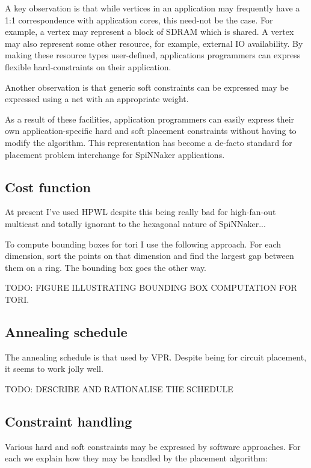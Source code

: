 			A key observation is that while vertices in an application may frequently
			have a 1:1 correspondence with application cores, this need-not be the
			case. For example, a vertex may represent a block of SDRAM which is
			shared. A vertex may also represent some other resource, for example,
			external IO availability. By making these resource types user-defined,
			applications programmers can express flexible hard-constraints on their
			application.
			
			Another observation is that generic soft constraints can be expressed may
			be expressed using a net with an appropriate weight.
			
			As a result of these facilities, application programmers can easily
			express their own application-specific hard and soft placement
			constraints without having to modify the algorithm. This representation
			has become a de-facto standard for placement problem interchange for
			SpiNNaker applications.
		
		\subsection{Cost function}
			
			At present I've used HPWL despite this being really bad for high-fan-out
			multicast and totally ignorant to the hexagonal nature of SpiNNaker...
			
			To compute bounding boxes for tori I use the following approach. For each
			dimension, sort the points on that dimension and find the largest gap
			between them on a ring. The bounding box goes the other way.
			
			TODO: FIGURE ILLUSTRATING BOUNDING BOX COMPUTATION FOR TORI.
		
		\subsection{Annealing schedule}
			
			The annealing schedule is that used by VPR. Despite being for circuit
			placement, it seems to work jolly well.
			
			TODO: DESCRIBE AND RATIONALISE THE SCHEDULE
		
		\subsection{Constraint handling}
			
			Various hard and soft constraints may be expressed by software
			approaches. For each we explain how they may be handled by the placement
			algorithm:
			
